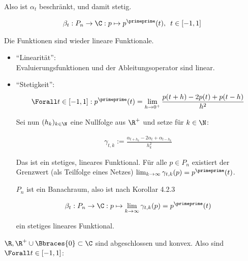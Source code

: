 \begin{solution}
\begin{itemize}
  Also ist $\alpha_t$ beschränkt, und damit stetig.

\end{itemize}

\begin{align*}
  \beta_t :
  P_n \to \C:
  p \mapsto p^\primeprime(t),
  \enspace
  t \in [-1, 1]
\end{align*}

Die Funktionen sind wieder lineare Funktionale.

\begin{itemize}

  \item
  \enquote{Linearität}: \\

  Evaluierungsfunktionen und der Ableitungsoperator sind linear.

  \item
  \enquote{Stetigkeit}: \\

  \begin{align*}
    \Forall t \in [-1, 1]:
    p^\primeprime(t)
    =
    \lim_{h \to 0^+} \frac{p(t+h) - 2 p(t) + p(t-h)}{h^2}
  \end{align*}

  Sei nun $(h_k)_{k \in \N}$ eine Nullfolge aus $\R^+$ und setze für $k \in \N$:

  \begin{align*}
    \gamma_{t, k}
    :=
    \frac
    {
      \alpha_{t + h_k} -
      2 \alpha_t +
      \alpha_{t - h_k}
    }
    {h_k^2}
  \end{align*}

  Das ist ein stetiges, lineares Funktional.
  Für alle $p \in P_n$ existiert der Grenzwert (als Teilfolge eines Netzes) $\lim_{k \to \infty} \gamma_{t, k}(p) = p^\primeprime(t)$.


  $P_n$ ist ein Banachraum, also ist nach Korollar 4.2.3

  \begin{align*}
    \beta_t:
    P_n \to \C:
    p \mapsto \lim_{k \to \infty} \gamma_{t, k}(p) = p^\primeprime(t)
  \end{align*}

  ein stetiges lineares Funktional.

\end{itemize}

$\R, \R^+ \cup \Bbraces{0} \subset \C$ sind abgeschlossen und konvex.
Also sind $\Forall t \in [-1, 1]$:


\end{solution}
